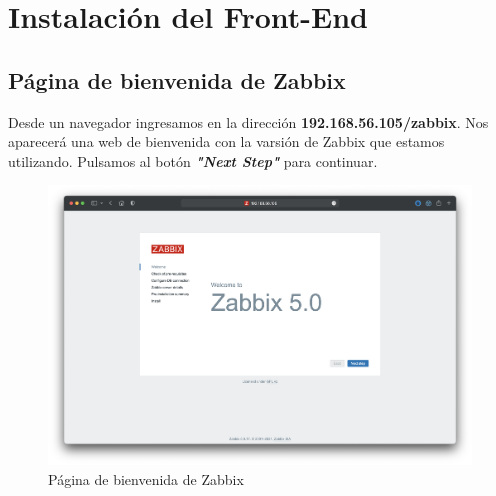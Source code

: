 \section{Instalación del Front-End}
    \subsection{Página de bienvenida de Zabbix}
    Desde un navegador ingresamos en la dirección \textbf{192.168.56.105/zabbix}. Nos aparecerá una web de bienvenida con la varsión de Zabbix que estamos utilizando. 
    Pulsamos al botón \textbf{\emph{"Next Step"}} para continuar.
    \begin{figure}[H]
        \centering
        \includegraphics[scale=0.25]{images/zabbix_installation_1.png}
        \caption{Página de bienvenida de Zabbix}
        \label{fig:zabbix_installation_1}
    \end{figure}


